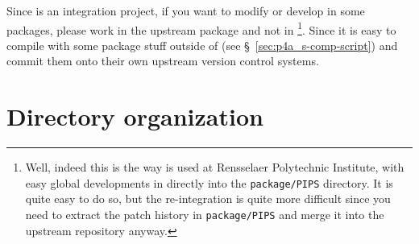 \documentclass[a4paper]{article}
\begin{document}
Since \Apfa is an integration project, if you want to modify or develop in
some packages, please work in the upstream package and not in
\Apfa\footnote{Well, indeed this is the way \Apfa is used at Rensselaer
  Polytechnic Institute, with easy global developments in \Apips directly
  into the \texttt{package/PIPS} directory. It is quite easy to do so, but
  the re-integration is quite more difficult since you need to extract the
  patch history in \texttt{package/PIPS} and merge it into the \Apips
  upstream \Asvn repository anyway.}. Since it is easy to compile \Apfa
with some package stuff outside of \Apfa (see
\S~\ref{sec:p4a_s-comp-script}) and commit them onto their own upstream
version control systems.


\section{Directory organization}
\label{sec:direct-organ}
\end{document}
